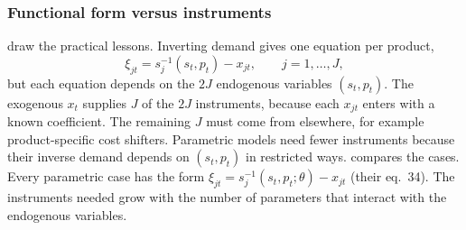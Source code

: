 \subsubsection{Functional form versus instruments}

\citet[Section 7]{BerryHaile2014} draw the practical lessons. Inverting demand gives one equation per product,
\begin{equation}\label{eq:08-bh-29}
  \xi_{jt} = s_j^{-1}(s_t, p_t) - x_{jt}, \qquad j = 1, \dots, J,
\end{equation}
but each equation depends on the $2J$ endogenous variables $(s_t, p_t)$. The exogenous $x_t$ supplies $J$ of the
$2J$ instruments, because each $x_{jt}$ enters with a known coefficient. The remaining $J$ must come from
elsewhere, for example product-specific cost shifters. Parametric models need fewer instruments because their
inverse demand depends on $(s_t, p_t)$ in restricted ways.  compares the cases. Every
parametric case has the form $\xi_{jt} = s_j^{-1}(s_t, p_t;\theta) - x_{jt}$ (their eq.~34). The instruments
needed grow with the number of parameters that interact with the endogenous variables.

